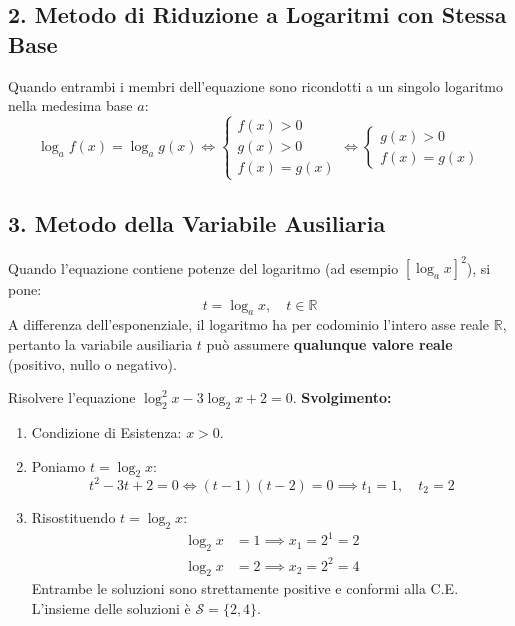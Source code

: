 \documentclass[11pt,a4paper,oneside]{report}
\begin{document}
\subsection{2. Metodo di Riduzione a Logaritmi con Stessa Base}
Quando entrambi i membri dell'equazione sono ricondotti a un singolo logaritmo nella medesima base $a$:
\begin{equation}
    \log_a f(x) = \log_a g(x) \iff \begin{cases} f(x) > 0 \\[1.2ex] g(x) > 0 \\[1.2ex] f(x) = g(x) \end{cases} \iff \begin{cases} g(x) > 0 \\[1.2ex] f(x) = g(x) \end{cases}
\end{equation}

\subsection{3. Metodo della Variabile Ausiliaria}
Quando l'equazione contiene potenze del logaritmo (ad esempio $[\log_a x]^2$), si pone:
\begin{equation}
    t = \log_a x, \quad t \in \mathbb{R}
\end{equation}
A differenza dell'esponenziale, il logaritmo ha per codominio l'intero asse reale $\mathbb{R}$, pertanto la variabile ausiliaria $t$ può assumere \textbf{qualunque valore reale} (positivo, nullo o negativo).

\begin{esempio}
Risolvere l'equazione $\log_2^2 x - 3\log_2 x + 2 = 0$.
\newline\textbf{Svolgimento:}
\begin{enumerate}
    \item Condizione di Esistenza: $x > 0$.
    \item Poniamo $t = \log_2 x$:
    \begin{equation*}
        t^2 - 3t + 2 = 0 \iff (t - 1)(t - 2) = 0 \implies t_1 = 1, \quad t_2 = 2
    \end{equation*}
    \item Risostituendo $t = \log_2 x$:
    \begin{align*}
        \log_2 x &= 1 \implies x_1 = 2^1 = 2 \\
        \log_2 x &= 2 \implies x_2 = 2^2 = 4
    \end{align*}
    Entrambe le soluzioni sono strettamente positive e conformi alla C.E. L'insieme delle soluzioni è $\mathcal{S} = \{2, 4\}$.
\end{enumerate}
\end{esempio}
\end{document}
